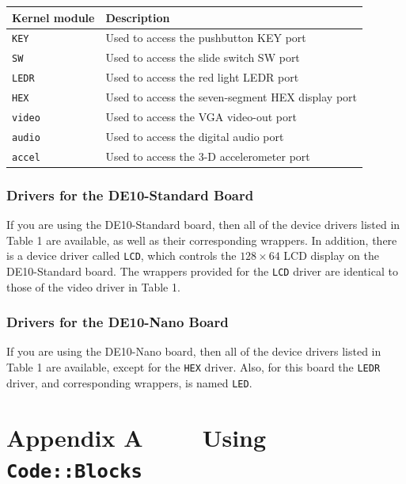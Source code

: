 \documentclass[11pt, twoside, pdftex]{article}
\begin{document}
\begin{table}
\centering
\begin{tabular}{l|p{8cm}}
{\bf Kernel module}	&	{\bf Description}\\\hline
\rule{0cm}{.5cm}\texttt{KEY}	&	Used to access the pushbutton KEY port\\
\texttt{SW}		&	Used to access the slide switch SW port\\
\texttt{LEDR}	&	Used to access the red light LEDR port\\
\texttt{HEX}	&	Used to access the seven-segment HEX display port\\
\texttt{video}	&	Used to access the VGA video-out port\\
\texttt{audio}	&	Used to access the digital audio port\\
\texttt{accel}	&	Used to access the 3-D accelerometer port\\
\end{tabular}
\label{tab:drivers}
\end{table}

\subsubsection*{Drivers for the DE10-Standard Board}

If you are using the DE10-Standard board, then all of the device drivers listed in Table 1
are available, as well as their corresponding wrappers. In addition, there is a device
driver called \texttt{LCD}, which controls the $128 \times 64$ LCD display on the
DE10-Standard board. The wrappers provided for the \texttt{LCD} driver are identical to
those of the video driver in Table 1.

\subsubsection*{Drivers for the DE10-Nano Board}

If you are using the DE10-Nano board, then all of the device drivers listed in Table 1 are
available, except for the \texttt{HEX} driver. Also, for this board the \texttt{LEDR}
driver, and corresponding wrappers, is named \texttt{LED}.

\newpage
\section*{Appendix A~~~~ Using \texttt{Code::Blocks}}
\end{document}
